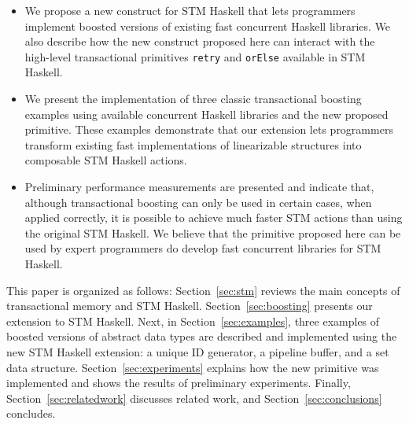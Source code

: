 \documentclass{llncs}
\begin{document}
\begin{itemize}
\item We propose a new construct for STM Haskell  that lets programmers implement boosted
versions of existing fast concurrent Haskell libraries.  We also describe how the new construct proposed here
can interact with the high-level transactional primitives  {\tt retry} and {\tt orElse} available in STM Haskell.
\item We present the implementation of three classic transactional boosting examples using available
concurrent Haskell libraries and the new proposed primitive. 
These examples demonstrate
that our extension lets programmers transform existing fast implementations of linearizable
structures into composable STM Haskell actions.
\item Preliminary performance measurements are presented and indicate that, although
transactional boosting can only be used in certain cases, when applied correctly, it is possible to
achieve much faster STM actions than using the original STM Haskell.
We believe that the primitive proposed here can be used by expert programmers do develop
fast concurrent libraries for STM Haskell.
\end{itemize}




This paper is organized as follows: Section~\ref{sec:stm} reviews the main concepts
of transactional memory and STM Haskell. Section~\ref{sec:boosting} presents our extension to STM Haskell. 
Next, in Section~\ref{sec:examples}, three examples of boosted versions of
abstract data types are described and implemented using the new STM Haskell
extension: a unique ID generator, a pipeline buffer, and a set data structure. Section~\ref{sec:experiments} explains how the new primitive was implemented  and shows the results of  preliminary experiments.
Finally, Section~\ref{sec:relatedwork} discusses related work, and Section~\ref{sec:conclusions} concludes.


\end{document}

